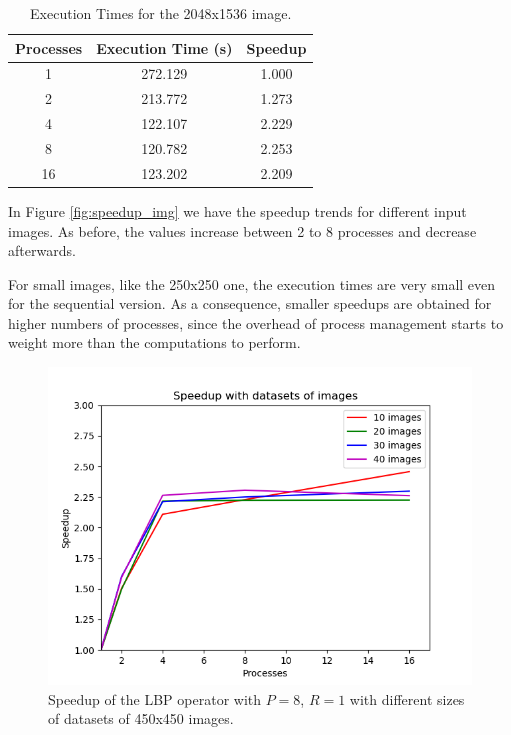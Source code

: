 \documentclass[10pt,twocolumn,letterpaper]{article}
\begin{document}
\begin{table}[H]
	\begin{center}
		\begin{tabular}{|c|c|c|}
			\hline
			Processes & Execution Time (s) & Speedup \\
			\hline
			1 & 272.129 & 1.000 \\
			2 & 213.772 & 1.273 \\
			4 & 122.107 & 2.229 \\
			8 & 120.782 & 2.253 \\
			16 & 123.202 & 2.209 \\
			\hline
		\end{tabular}
	\end{center}
	\caption{Execution Times for the 2048x1536 image.}
	\label{tab:speedup_i_4}
\end{table}

In Figure \ref{fig:speedup_img} we have the speedup trends for different input images. As before, the values increase between 2 to 8 processes and decrease afterwards.

For small images, like the 250x250 one, the execution times are very small even for the sequential version. As a consequence, smaller speedups are obtained for higher numbers of processes, since the overhead of process management starts to weight more than the computations to perform.

\begin{figure}[H]
	\includegraphics[width=\linewidth]{images/speedup_by_ds.png}
	\caption{Speedup of the LBP operator with $P=8$, $R=1$ with different sizes of datasets of 450x450 images.}
	\label{fig:speedup_ds}
\end{figure}
\end{document}
